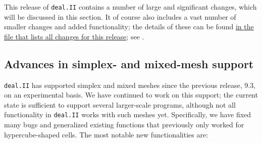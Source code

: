 \documentclass{ansarticle-preprint}
\newcommand{\specialword}[1]{\texttt{#1}}
\newcommand{\dealii}{{\specialword{deal.II}}\xspace}
\begin{document}
This release of \dealii contains a number of large and significant changes,
which will be discussed in this section.
It of course also includes a
vast number of smaller changes and added functionality; the details of these
can be found
\href{https://dealii.org/developer/doxygen/deal.II/changes_between_9_3_0_and_9_4_0.html}
{in the file that lists all changes for this release}; see \cite{changes94}.


\subsection{Advances in simplex- and mixed-mesh support}\label{sec:simplex}

\dealii has supported simplex and mixed meshes since the previous
release, 9.3, on an experimental basis.
We have continued to work on this support; the current state is
sufficient to support several larger-scale programs, although not all
functionality in \dealii works with such meshes yet. Specifically,
we have fixed many bugs and generalized existing functions that
previously only worked for hypercube-shaped cells. The most notable
new functionalities are:
\end{document}
